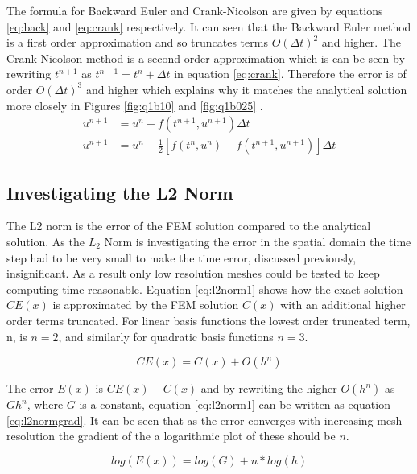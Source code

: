 \documentclass[11pt]{article}
\begin{document}
The formula for Backward Euler and Crank-Nicolson are given by equations \eqref{eq:back} and \eqref{eq:crank} respectively. It can seen that the Backward Euler method is a first order approximation and so truncates terms $O(\Delta t)^2$ and higher. The Crank-Nicolson method is a second order approximation which is can be seen by rewriting $t^{n+1}$ as $t^{n+1} = t^n+\Delta t$ in equation \eqref{eq:crank}. Therefore the error is of order  $O(\Delta t)^3$ and higher which explains why it matches the analytical solution more closely in Figures \ref{fig:q1b10} and \ref{fig:q1b025} .
\begin{subequations}
\begin{align}
u^{n+1} &= u^n + f(t^{n+1},u^{n+1})\Delta t \label{eq:back} \\ 
u^{n+1} &= u^n + \frac{1}{2}[f(t^n,u^n) + f(t^{n+1},u^{n+1})]\Delta t \label{eq:crank} 
\end{align}
\end{subequations}

\FloatBarrier
\subsection{Investigating the L2 Norm}

The L2 norm is the error of the FEM solution compared to the analytical solution. As the $L_2$ Norm is investigating the error in the  spatial domain the time step had to be very small to make the time error, discussed previously, insignificant. As a result only low resolution meshes could be tested to keep computing time reasonable. Equation \eqref{eq:l2norm1} shows how the exact solution $CE(x)$ is approximated by the FEM solution $C(x)$ with an additional higher order terms truncated. For linear basis functions the lowest order truncated term, n,  is $n = 2$, and similarly for quadratic basis functions $n = 3$.

\begin{equation} \label{eq:l2norm1}
CE(x) = C(x) + O(h^n)
\end{equation}

The error $E(x)$ is $CE(x) - C(x)$ and by rewriting the higher $O(h^n)$ as $Gh^n$, where $G$ is a constant, equation \eqref{eq:l2norm1} can be written as equation \eqref{eq:l2normgrad}. It can be seen that as the error converges with increasing mesh resolution the gradient of the a logarithmic plot of these should be $n$. 


\begin{equation} \label{eq:l2normgrad}
log(E(x)) = log(G) + n*log(h)
\end{equation}
\end{document}
